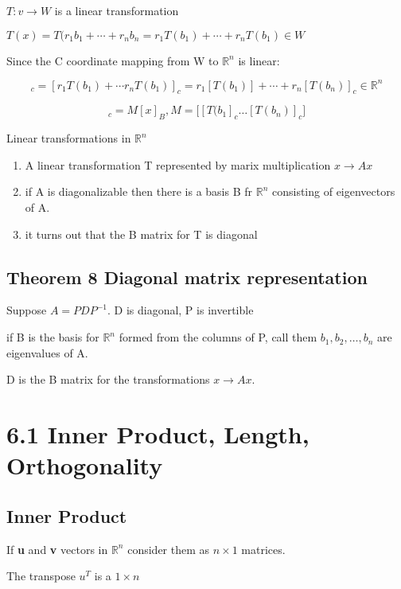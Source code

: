 	$T:v\to W$ is a linear transformation


	$T(x)=T(r_{1}b_{1}+\cdots +r_{n}b_{n}=r_{1}T(b_{1})+\cdots +r_{n}T(b_{1}) \in W$

	Since the C coordinate mapping from W to $\mathbb{R}^{n}$ is linear:

	\begin{equation}
		[T(x)]_{c}=[r_{1}T(b_{1})+\cdots r_{n}T(b_{1})]_{c} = r_{1}[T(b_{1})]+\cdots +r_{n}[T(b_{n})]_{c} \in \mathbb{R}^{n}
	\end{equation}

	\begin{equation}
		[T(x)]_{c}=M[x]_{B},	M=\bigl[[T(b_{1}]_{c}\ldots[T(b_{n})]_{c}\bigr]	
	\end{equation}
	
Linear transformations in $\mathbb{R}^{n}$

\begin{enumerate}
	\item A linear transformation T represented by marix multiplication $x\to Ax$
	\item if A is diagonalizable then there is a basis B fr $\mathbb{R}^{n}$ consisting of eigenvectors of A.
	\item it turns out that the B matrix for T is diagonal
\end{enumerate}
\subsection{Theorem 8 Diagonal matrix representation}
Suppose $A=PDP^{-1}$. D is diagonal, P is invertible

if B is the basis for $\mathbb{R}^{n}$ formed from the columns of P, call them $b_{1},b_{2},\ldots,b_{n}$ are eigenvalues of A. 

D is the B matrix for the transformations $x\to Ax$. 



\section{6.1 Inner Product, Length, Orthogonality}

\subsection{Inner Product}
If \textbf{u} and \textbf{v} vectors in $\mathbb{R}^{n}$ consider them as $n\times 1$ matrices.

The transpose $u^{T}$ is a $1\times n$

